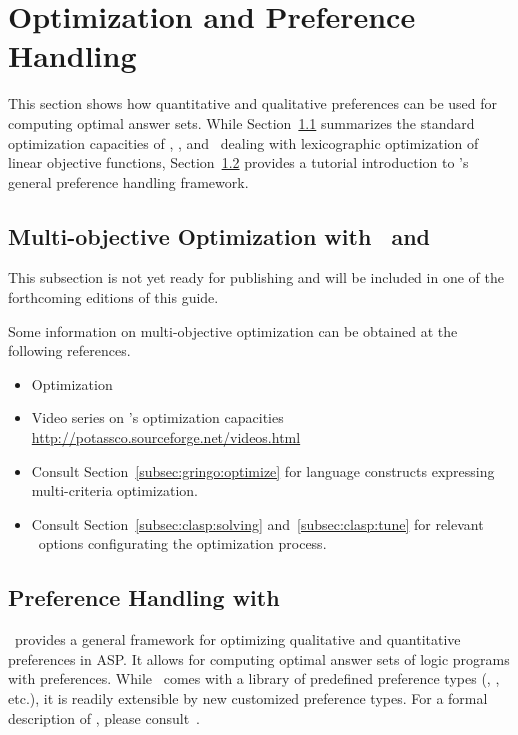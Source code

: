 
\section{Optimization and Preference Handling}
\label{sec:prefopt}

This section shows how quantitative and qualitative preferences can be used for computing optimal answer sets.
While Section~\ref{sec:optimization} summarizes the standard optimization capacities of \clasp, \gringo, and \clingo\
dealing with lexicographic optimization of linear objective functions,
Section~\ref{sec:asprin} provides a tutorial introduction to \asprin's general preference handling framework.

\subsection{Multi-objective Optimization with \clasp\ and \clingo}
\label{sec:optimization}

This subsection is not yet ready for publishing
and will be included in one of the forthcoming editions of this guide.

Some information on multi-objective optimization
can be obtained at the following references.

\begin{itemize}
\item Optimization \cite{gekakasc11b,gekakasc11c,gekasc11b,ankamasc12a}
\item Video series on \clasp's optimization capacities \url{http://potassco.sourceforge.net/videos.html}
\item Consult Section~\ref{subsec:gringo:optimize} for language constructs expressing multi-criteria optimization.
\item Consult Section~\ref{subsec:clasp:solving} and~\ref{subsec:clasp:tune} for relevant \clasp\ options configurating the optimization process.
\end{itemize}

\subsection{Preference Handling with \asprin}\label{sec:asprin}
\asprin\ provides a general framework for optimizing qualitative and quantitative preferences in ASP.
It allows for computing optimal answer sets of logic programs with preferences.
While \asprin\ comes with a library of predefined preference types 
(\code{subset}, \code{pareto}, etc.),
it is readily extensible by new customized preference types.
For a formal description of \asprin, please consult~\cite{brderosc15a}.

